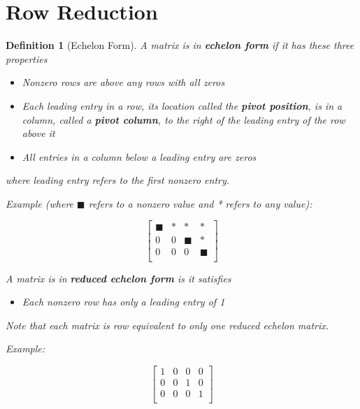 \documentclass[12pt]{report}
\newtheorem{dfn}{Definition}
\begin{document}
\section{Row Reduction}

\begin{dfn}[Echelon Form]
A matrix is in \textbf{echelon form} if it has these three properties

\begin{itemize}
\item Nonzero rows are above any rows with all zeros
\item Each leading entry in a row, its location called the \textbf{pivot position}, is in a column, called a \textbf{pivot column}, to the right of the leading entry of the row above it
\item All entries in a column below a leading entry are zeros
\end{itemize}

where leading entry refers to the first nonzero entry. 

Example (where $\blacksquare$ refers to a nonzero value and * refers to any value):

\begin{equation}
\begin{bmatrix}
	\blacksquare & * & * & * \\
	0 & 0 & \blacksquare & * \\
	0 & 0 & 0 & \blacksquare \\
\end{bmatrix}
\end{equation}

A matrix is in \textbf{reduced echelon form} is it satisfies

\begin{itemize}
\item Each nonzero row has only a leading entry of 1
\end{itemize}

Note that each matrix is row equivalent to only one reduced echelon matrix.

Example:

\begin{equation}
\begin{bmatrix}
	1 & 0 & 0 & 0 \\
	0 & 0 & 1 & 0 \\
	0 & 0 & 0 & 1 \\
\end{bmatrix}
\end{equation}

\end{dfn}
\end{document}
